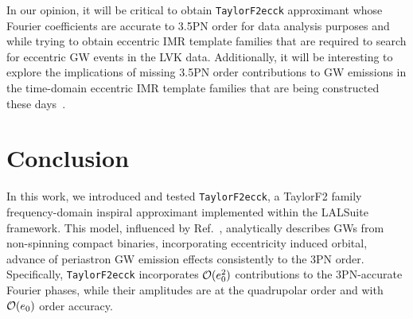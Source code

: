 \documentclass[aps,prd,twocolumn,superscriptaddress,groupedaddress,nofootinbib,showpacs,eqsecnum,useAms]{revtex4-2}
\begin{document}
In our opinion, it will be critical to obtain \texttt{TaylorF2ecck} approximant  whose Fourier coefficients are accurate to 3.5PN order for data analysis purposes and while trying to obtain eccentric IMR template families that are required to search for eccentric GW events in the LVK data. Additionally, it will be interesting to explore the implications of missing 3.5PN order contributions to GW emissions in the time-domain eccentric IMR template families that are being constructed these days~\cite{Huerta2018}.

\section{ Conclusion }\label{sec:conclusion}

In this work, we introduced and tested \texttt{TaylorF2ecck}, a TaylorF2 family frequency-domain inspiral approximant implemented within the LALSuite framework. This model, influenced by Ref.~\cite{TGHH}, analytically describes GWs from non-spinning compact binaries, incorporating eccentricity induced orbital, advance of periastron GW emission effects consistently to the 3PN order. Specifically, \texttt{TaylorF2ecck} incorporates ${\cal O}(e_0^2)$ contributions to the 3PN-accurate Fourier phases, while their amplitudes are at the quadrupolar order and with ${\cal O}(e_0)$ order accuracy.
\end{document}
